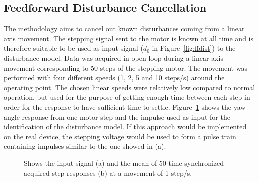 \subsection{Feedforward Disturbance Cancellation}\label{sec:hc}
The \abbrFDC methodology aims to cancel out known disturbances coming from a linear axis movement. The stepping signal sent to the motor is known at all time and is therefore suitable to be used as input signal ($d_0$ in Figure~\ref{fig:ffdist}) to the disturbance model. Data was acquired in open loop during a linear axis movement corresponding to 50 steps of the stepping motor. The movement was performed with four different speeds (1, 2, 5 and 10 steps/s) around the operating point. The chosen linear speeds were relatively low compared to normal operation, but used for the purpose of getting enough time between each step in order for the response to have sufficient time to settle. Figure~\ref{fig:stepinout} shows the yaw angle response from one motor step and the impulse used as input for the identification of the disturbance model. If this approach would be implemented on the real device, the stepping voltage would be used to form a pulse train containing impulses similar to the one showed in (a).

\begin{figure}[h!]
  \centering %
  \qquad
  \caption{\label{fig:stepinout} Shows the input signal (a) and the mean of 50 time-synchronized acquired step responses (b) at a movement of 1 step/s.}
\end{figure}

